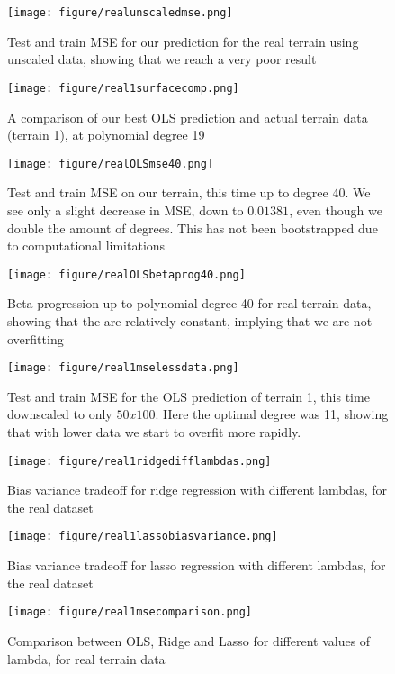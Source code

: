 \documentclass[onecolumn,10pt,cleanfoot]{asme2ej}
\begin{document}
\begin{figure*}
\centerline{\texttt{[image: figure/realunscaledmse.png]}}
\caption{Test and train MSE for our prediction for the real terrain using unscaled data, showing that we reach a very poor result}
\label{realunscaledmse}
\end{figure*}




\begin{figure*} 
\centerline{\texttt{[image: figure/real1surfacecomp.png]}}
\caption{A comparison of our best OLS prediction and actual terrain data (terrain 1), at polynomial degree 19}
\label{real1surfacecomp}
\end{figure*}

\begin{figure*}
\centerline{\texttt{[image: figure/realOLSmse40.png]}}
\caption{Test and train MSE on our terrain, this time up to degree 40. We see only a slight decrease in MSE, down to $0.01381$, even though we double the amount of degrees. This has not been bootstrapped due to computational limitations}
\label{realOLSmse40}
\end{figure*}

\begin{figure*}
\centerline{\texttt{[image: figure/realOLSbetaprog40.png]}}
\caption{Beta progression up to polynomial degree 40 for real terrain data, showing that the are relatively constant, implying that we are not overfitting}
\label{realOLSbetaprog40}
\end{figure*}

\begin{figure*}
\centerline{\texttt{[image: figure/real1mselessdata.png]}}
\caption{Test and train MSE for the OLS prediction of terrain 1, this time downscaled to only $50x100$. Here the optimal degree was 11, showing that with lower data we start to overfit more rapidly.}
\label{real1mselessdata}
\end{figure*}

\begin{figure} 
\centerline{\texttt{[image: figure/real1ridgedifflambdas.png]}}
\caption{Bias variance tradeoff for ridge regression with different lambdas, for the real dataset}
\label{real1ridgedifflambdas}
\end{figure}

\begin{figure} 
\centerline{\texttt{[image: figure/real1lassobiasvariance.png]}}
\caption{Bias variance tradeoff for lasso regression with different lambdas, for the real dataset}
\label{real1lassobiasvariance}
\end{figure}

\begin{figure*}
\centerline{\texttt{[image: figure/real1msecomparison.png]}}
\caption{Comparison between OLS, Ridge and Lasso for different values of lambda, for real terrain data}
\label{real1msecomparison}
\end{figure*}
\end{document}
